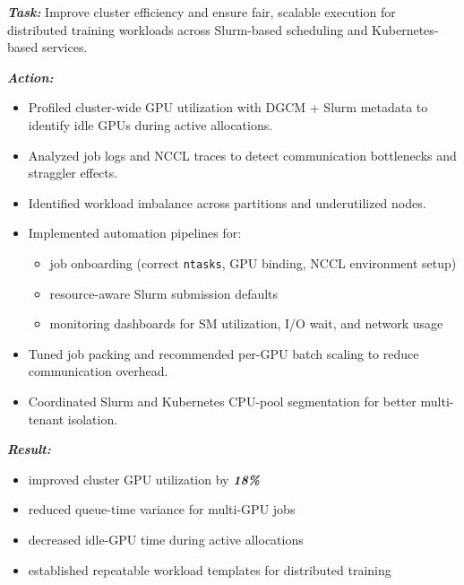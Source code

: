 \documentclass[12pt]{article}
\let\origtextbf\textbf
\renewcommand{\textbf}[1]{\origtextbf{\textit{#1}}}
\begin{document}
\textbf{Task:}
Improve cluster efficiency and ensure fair, scalable execution for distributed training workloads across Slurm-based scheduling and Kubernetes-based services.

\textbf{Action:}
\begin{itemize}
\item Profiled cluster-wide GPU utilization with DGCM + Slurm metadata to identify idle GPUs during active allocations.
\item Analyzed job logs and NCCL traces to detect communication bottlenecks and straggler effects.
\item Identified workload imbalance across partitions and underutilized nodes.
\item Implemented automation pipelines for:
\begin{itemize}
\item job onboarding (correct \texttt{ntasks}, GPU binding, NCCL environment setup)
\item resource-aware Slurm submission defaults
\item monitoring dashboards for SM utilization, I/O wait, and network usage
\end{itemize}
\item Tuned job packing and recommended per-GPU batch scaling to reduce communication overhead.
\item Coordinated Slurm and Kubernetes CPU-pool segmentation for better multi-tenant isolation.
\end{itemize}

\textbf{Result:}
\begin{itemize}
\item improved cluster GPU utilization by \textbf{18\%}
\item reduced queue-time variance for multi-GPU jobs
\item decreased idle-GPU time during active allocations
\item established repeatable workload templates for distributed training
\end{itemize}
\end{document}
